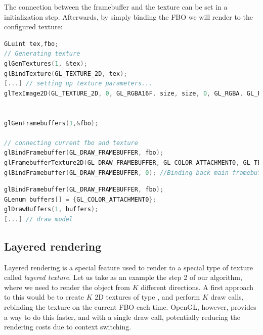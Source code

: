 The connection between the framebuffer and the texture can be set in a initialization step. Afterwards, by simply binding the FBO we will render to the configured texture:

\begin{lstlisting}[language=C++,label=lst:rendertotextureinit,caption={Render to texture example, initilalization phase. Note the call to \gl{glFramebufferTexture2D}}]
GLuint tex,fbo;
// Generating texture
glGenTextures(1, &tex);
glBindTexture(GL_TEXTURE_2D, tex);
[...] // setting up texture parameters...
glTexImage2D(GL_TEXTURE_2D, 0, GL_RGBA16F, size, size, 0, GL_RGBA, GL_FLOAT, 0);


glGenFramebuffers(1,&fbo);

// connecting current fbo and texture
glBindFramebuffer(GL_DRAW_FRAMEBUFFER, fbo);
glFramebufferTexture2D(GL_DRAW_FRAMEBUFFER, GL_COLOR_ATTACHMENT0, GL_TEXTURE_2D, tex, 0);
glBindFramebuffer(GL_DRAW_FRAMEBUFFER, 0); //Binding back main framebuffer
\end{lstlisting}

\begin{lstlisting}[language=C++,label=lst:rendertotexturerender,caption={Render to texture example, rendering phase. Since we have not configured and FBO for depth and stencil buffers, depth testing and stencil should be disabled at this point.}]
glBindFramebuffer(GL_DRAW_FRAMEBUFFER, fbo);
GLenum buffers[] = {GL_COLOR_ATTACHMENT0};
glDrawBuffers(1, buffers);
[...] // draw model
\end{lstlisting}

\subsection{Layered rendering}
Layered rendering is a special feature used to render to a special type of texture called \emph{layered texture}. Let us take as an example the step 2 of our algorithm, where we need to render the object from $K$ different directions. A first approach to this would be to create $K$ 2D textures of type , and perform $K$ draw calls, rebinding the texture on the current FBO each time. OpenGL, however, provides a way to do this faster, and with a single draw call, potentially reducing the rendering costs due to context switching.

